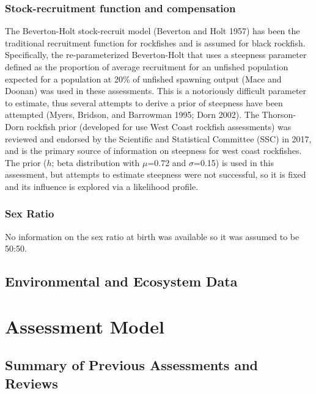 \documentclass[11pt,
  english,
  letterpaper,
]{article}
\begin{document}
\hypertarget{stock-recruitment-function-and-compensation}{%
\subsubsection{Stock-recruitment function and compensation}\label{stock-recruitment-function-and-compensation}}

The Beverton-Holt stock-recruit model (Beverton and Holt 1957) has been the traditional recruitment function for rockfishes and is assumed for black rockfish. Specifically, the re-parameterized Beverton-Holt that uses a steepness parameter defined as the proportion of average recruitment for an unfished population expected for a population at 20\% of unfished spawning output (Mace and Doonan) was used in these assessments. This is a notoriously difficult parameter to estimate, thus several attempts to derive a prior of steepness have been attempted (Myers, Bridson, and Barrowman 1995; Dorn 2002). The Thorson-Dorn rockfish prior (developed for use West Coast rockfish assessments) was reviewed and endorsed by the Scientific and Statistical Committee (SSC) in 2017, and is the primary source of information on steepness for west coast rockfishes. The prior (\(h\); beta distribution with \(\mu\)=0.72 and \(\sigma\)=0.15) is used in this assessment, but attempts to estimate steepness were not successful, so it is fixed and its influence is explored via a likelihood profile.

\hypertarget{sex-ratio}{%
\subsubsection{Sex Ratio}\label{sex-ratio}}

No information on the sex ratio at birth was available so it was assumed to be 50:50.

\hypertarget{environmental-and-ecosystem-data}{%
\subsection{Environmental and Ecosystem Data}\label{environmental-and-ecosystem-data}}

\hypertarget{assessment-model}{%
\section{Assessment Model}\label{assessment-model}}

\hypertarget{summary-of-previous-assessments-and-reviews}{%
\subsection{Summary of Previous Assessments and Reviews}\label{summary-of-previous-assessments-and-reviews}}
\end{document}
